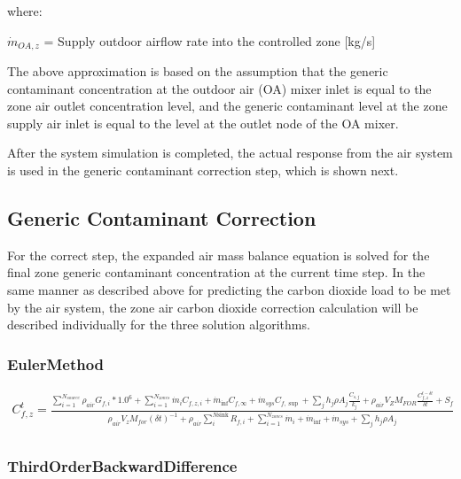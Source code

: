 where:

\({\dot m_{OA,z}}\) = Supply outdoor airflow rate into the controlled zone {[}kg/s{]}

The above approximation is based on the assumption that the generic contaminant concentration at the outdoor air (OA) mixer inlet is equal to the zone air outlet concentration level, and the generic contaminant level at the zone supply air inlet is equal to the level at the outlet node of the OA mixer.

After the system simulation is completed, the actual response from the air system is used in the generic contaminant correction step, which is shown next.

\subsection{Generic Contaminant Correction}\label{generic-contaminant-correction}

For the correct step, the expanded air mass balance equation is solved for the final zone generic contaminant concentration at the current time step. In the same manner as described above for predicting the carbon dioxide load to be met by the air system, the zone air carbon dioxide correction calculation will be described individually for the three solution algorithms.

\subsubsection{EulerMethod}\label{eulermethod-1-000}

\begin{equation}
\begin{array}{l}C_{f,z}^t = \frac{{\sum\limits_{i = 1}^{{N_{source}}} {{\rho_{air}}{G_{f,i}}*{{1.0}^6}}  + \sum\limits_{i = 1}^{{N_{zones}}} {{{\dot m}_i}{C_{f,z,i}}}  + {{\dot m}_{\inf }}{C_{f,\infty }} + {{\dot m}_{sys}}{C_{f,\sup }} + \sum\limits_j {{h_j}\rho {A_j}\frac{{{C_{s,j}}}}{{{k_j}}} + {\rho_{air}}{V_Z}{M_{FOR}}\frac{{C_{f,z}^{t - \delta t}}}{{\delta t}} + {S_f}} }}{{{\rho_{air}}{V_z}{M_{for}}{{\left( {\delta t} \right)}^{ - 1}} + {\rho_{air}}\sum\limits_i^{N{\mathrm{sink}}} {{R_{f,i}}}  + \sum\limits_{i = 1}^{{N_{zones}}} {{{\dot m}_i}}  + {{\dot m}_{\inf }} + {{\dot m}_{sys}} + \sum\limits_j {{h_j}\rho {A_j}} }}\\\end{array}
\end{equation}

\subsubsection{ThirdOrderBackwardDifference}\label{thirdorderbackwarddifference-1-000}

